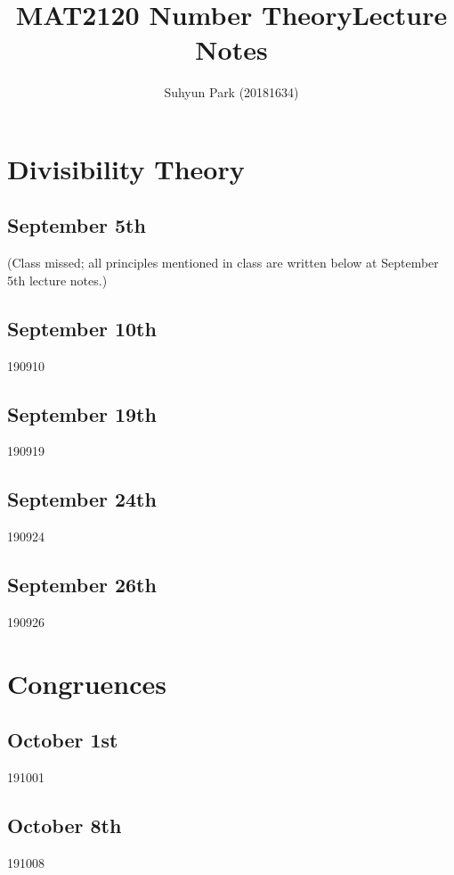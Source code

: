 
\usetikzlibrary{angles,patterns,calc}



\title{MAT2120 Number Theory\newline\space Lecture Notes}
\author{Suhyun Park (20181634)}

\maketitle

\section{Divisibility Theory}
\subsection{September 5th}
(Class missed; all principles mentioned in class are written below at September 5th lecture notes.)

\subsection{September 10th}
{190910}

\subsection{September 19th}
{190919}

\subsection{September 24th}
{190924}

\subsection{September 26th}
{190926}

\section{Congruences}
\subsection{October 1st}
{191001}

\subsection{October 8th}
{191008}

